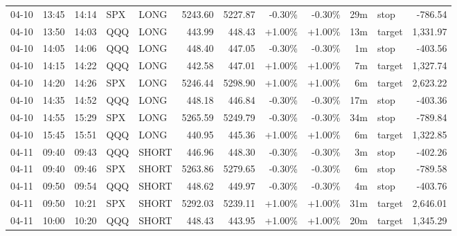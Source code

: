\documentclass[11pt,a4paper,twoside]{article}
\begin{document}
\begin{center}
\begin{longtable}{>{\color{txtmain}}l l l l l r r r r r >{\color{txtmain}}l r}
04-10 & 13:45 & 14:14 & SPX & LONG & 5243.60 & 5227.87 & \textcolor{lossred}{-0.30\%} & \textcolor{lossred}{-0.30\%} & 29m & stop & \textcolor{lossred}{-786.54} \\
04-10 & 13:50 & 14:03 & QQQ & LONG & 443.99 & 448.43 & \textcolor{wingreen}{+1.00\%} & \textcolor{wingreen}{+1.00\%} & 13m & target & \textcolor{wingreen}{1,331.97} \\
04-10 & 14:05 & 14:06 & QQQ & LONG & 448.40 & 447.05 & \textcolor{lossred}{-0.30\%} & \textcolor{lossred}{-0.30\%} & 1m & stop & \textcolor{lossred}{-403.56} \\
04-10 & 14:15 & 14:22 & QQQ & LONG & 442.58 & 447.01 & \textcolor{wingreen}{+1.00\%} & \textcolor{wingreen}{+1.00\%} & 7m & target & \textcolor{wingreen}{1,327.74} \\
04-10 & 14:20 & 14:26 & SPX & LONG & 5246.44 & 5298.90 & \textcolor{wingreen}{+1.00\%} & \textcolor{wingreen}{+1.00\%} & 6m & target & \textcolor{wingreen}{2,623.22} \\
04-10 & 14:35 & 14:52 & QQQ & LONG & 448.18 & 446.84 & \textcolor{lossred}{-0.30\%} & \textcolor{lossred}{-0.30\%} & 17m & stop & \textcolor{lossred}{-403.36} \\
04-10 & 14:55 & 15:29 & SPX & LONG & 5265.59 & 5249.79 & \textcolor{lossred}{-0.30\%} & \textcolor{lossred}{-0.30\%} & 34m & stop & \textcolor{lossred}{-789.84} \\
04-10 & 15:45 & 15:51 & QQQ & LONG & 440.95 & 445.36 & \textcolor{wingreen}{+1.00\%} & \textcolor{wingreen}{+1.00\%} & 6m & target & \textcolor{wingreen}{1,322.85} \\
04-11 & 09:40 & 09:43 & QQQ & SHORT & 446.96 & 448.30 & \textcolor{lossred}{-0.30\%} & \textcolor{lossred}{-0.30\%} & 3m & stop & \textcolor{lossred}{-402.26} \\
04-11 & 09:40 & 09:46 & SPX & SHORT & 5263.86 & 5279.65 & \textcolor{lossred}{-0.30\%} & \textcolor{lossred}{-0.30\%} & 6m & stop & \textcolor{lossred}{-789.58} \\
04-11 & 09:50 & 09:54 & QQQ & SHORT & 448.62 & 449.97 & \textcolor{lossred}{-0.30\%} & \textcolor{lossred}{-0.30\%} & 4m & stop & \textcolor{lossred}{-403.76} \\
04-11 & 09:50 & 10:21 & SPX & SHORT & 5292.03 & 5239.11 & \textcolor{wingreen}{+1.00\%} & \textcolor{wingreen}{+1.00\%} & 31m & target & \textcolor{wingreen}{2,646.01} \\
04-11 & 10:00 & 10:20 & QQQ & SHORT & 448.43 & 443.95 & \textcolor{wingreen}{+1.00\%} & \textcolor{wingreen}{+1.00\%} & 20m & target & \textcolor{wingreen}{1,345.29} \\

\end{longtable}
\end{center}
\end{document}
